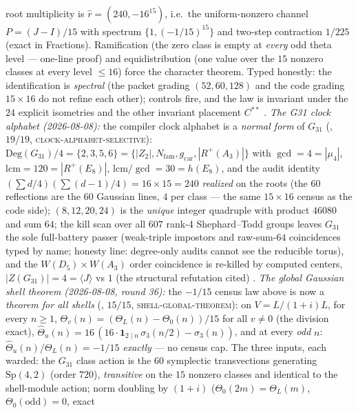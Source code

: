 \documentclass[11pt,a4paper]{article}
\newcommand{\gcar}{g_{\mathrm{car}}}
\newcommand{\Nfam}{N_{\mathrm{fam}}}
\theoremstyle{definition}
\begin{document}
\begin{keybox}
root multiplicity is $\hat r = (240, -16^{15})$, i.e.\ the
uniform-nonzero channel $P = (J - I)/15$ with spectrum
$\{1, (-1/15)^{15}\}$ and two-step contraction $1/225$ (exact
in Fractions).  Ramification (the zero class is empty at
\emph{every} odd theta level --- one-line proof) and
equidistribution (one value over the $15$ nonzero classes at
every level $\le 16$) force the character theorem.  Typed
honestly: the identification is \emph{spectral} (the packet
grading $(52, 60, 128)$ and the code grading $15 \times 16$ do
not refine each other); controls fire, and the law is invariant
under the $24$ explicit isometries and the other invariant
placement $C^{**}$ \mE.
\emph{The G31 clock alphabet (2026-08-08):} the compiler clock
alphabet is a \emph{normal form} of $G_{31}$
(, $19/19$,
\textsc{clock-alphabet-selective}):
$\mathrm{Deg}(G_{31})/4 = \{2, 3, 5, 6\} = \{|Z_2|,
\Nfam, \gcar, |R^{+}(A_3)|\}$ with $\gcd = 4 = |\mu_4|$,
$\mathrm{lcm} = 120 = |R^{+}(E_8)|$, $\mathrm{lcm}/\gcd = 30 =
h(E_8)$, and the audit identity $(\sum d/4)(\sum(d{-}1)/4) = 16
\times 15 = 240$ \emph{realized} on the roots (the $60$
reflections are the $60$ Gaussian lines, $4$ per class --- the
same $15 \times 16$ census as the code side); $(8, 12, 20, 24)$
is the \emph{unique} integer quadruple with product $46080$ and
sum $64$; the kill scan over all $607$ rank-4 Shephard--Todd
groups leaves $G_{31}$ the sole full-battery passer (weak-triple
impostors and raw-sum-$64$ coincidences typed by name; honesty
line: degree-only audits cannot see the reducible torus), and
the $W(D_5) \times W(A_3)$ order coincidence is re-killed by
computed centers, $|Z(G_{31})| = 4 = \langle J\rangle$ vs $1$
(the structural refutation cited) \mE.
\emph{The global Gaussian shell theorem (2026-08-08, round 36):}
the $-1/15$ census law above is now a \emph{theorem for all
shells} (, $15/15$,
\textsc{shell-global-theorem}): on $V = L/(1{+}i)L$, for every
$n \ge 1$, $\Theta_v(n) = (\Theta_L(n) - \Theta_0(n))/15$ for all
$v \ne 0$ (the division exact), $\hat\Theta_u(n) =
16\,(16\cdot\mathbf 1_{2\mid n}\,\sigma_3(n/2) - \sigma_3(n))$,
and at every \emph{odd} $n$: $\hat\Theta_u(n)/\Theta_L(n) =
-1/15$ \emph{exactly} --- no census cap.  The three inputs, each
warded: the $G_{31}$ class action is the $60$ symplectic
transvections generating $\mathrm{Sp}(4,2)$ (order $720$),
\emph{transitive} on the $15$ nonzero classes and identical to
the shell-module action; norm doubling by $(1{+}i)$
($\Theta_0(2m) = \Theta_L(m)$, $\Theta_0(\text{odd}) = 0$, exact

\end{keybox}
\end{document}
